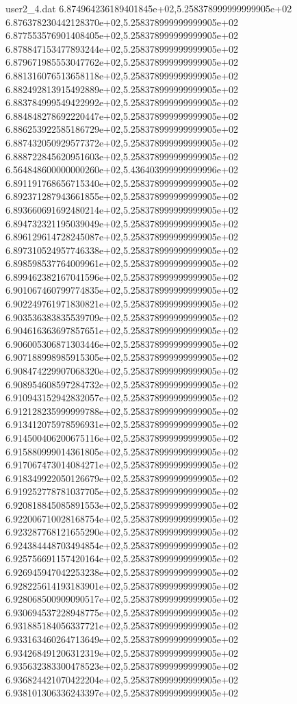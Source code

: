 \begin{filecontents}{user2_4.dat}
6.874964236189401845e+02,5.258378999999999905e+02
6.876378230442128370e+02,5.258378999999999905e+02
6.877553576901408405e+02,5.258378999999999905e+02
6.878847153477893244e+02,5.258378999999999905e+02
6.879671985553047762e+02,5.258378999999999905e+02
6.881316076513658118e+02,5.258378999999999905e+02
6.882492813915492889e+02,5.258378999999999905e+02
6.883784999549422992e+02,5.258378999999999905e+02
6.884848278692220447e+02,5.258378999999999905e+02
6.886253922585186729e+02,5.258378999999999905e+02
6.887432050929577372e+02,5.258378999999999905e+02
6.888722845620951603e+02,5.258378999999999905e+02
6.564848600000000260e+02,5.436403999999999996e+02
6.891191768656715340e+02,5.258378999999999905e+02
6.892371287943661855e+02,5.258378999999999905e+02
6.893660691692480214e+02,5.258378999999999905e+02
6.894732321195039049e+02,5.258378999999999905e+02
6.896129614728245087e+02,5.258378999999999905e+02
6.897310524957746338e+02,5.258378999999999905e+02
6.898598537764009961e+02,5.258378999999999905e+02
6.899462382167041596e+02,5.258378999999999905e+02
6.901067460799774835e+02,5.258378999999999905e+02
6.902249761971830821e+02,5.258378999999999905e+02
6.903536383835539709e+02,5.258378999999999905e+02
6.904616363697857651e+02,5.258378999999999905e+02
6.906005306871303446e+02,5.258378999999999905e+02
6.907188998985915305e+02,5.258378999999999905e+02
6.908474229907068320e+02,5.258378999999999905e+02
6.908954608597284732e+02,5.258378999999999905e+02
6.910943152942832057e+02,5.258378999999999905e+02
6.912128235999999788e+02,5.258378999999999905e+02
6.913412075978596931e+02,5.258378999999999905e+02
6.914500406200675116e+02,5.258378999999999905e+02
6.915880999014361805e+02,5.258378999999999905e+02
6.917067473014084271e+02,5.258378999999999905e+02
6.918349922050126679e+02,5.258378999999999905e+02
6.919252778781037705e+02,5.258378999999999905e+02
6.920818845085891553e+02,5.258378999999999905e+02
6.922006710028168754e+02,5.258378999999999905e+02
6.923287768121655290e+02,5.258378999999999905e+02
6.924384448703494854e+02,5.258378999999999905e+02
6.925756691157420164e+02,5.258378999999999905e+02
6.926945947042253238e+02,5.258378999999999905e+02
6.928225614193183901e+02,5.258378999999999905e+02
6.928068500909090517e+02,5.258378999999999905e+02
6.930694537228948775e+02,5.258378999999999905e+02
6.931885184056337721e+02,5.258378999999999905e+02
6.933163460264713649e+02,5.258378999999999905e+02
6.934268491206312319e+02,5.258378999999999905e+02
6.935632383300478523e+02,5.258378999999999905e+02
6.936824421070422204e+02,5.258378999999999905e+02
6.938101306336243397e+02,5.258378999999999905e+02

\end{filecontents}
